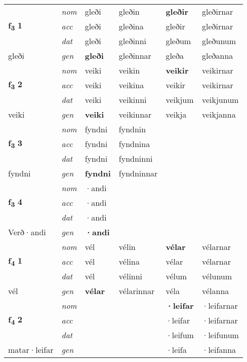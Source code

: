 \begin{longtable}[l]{X>{\footnotesize\itshape}XXXXX}
\multirow{3}{*}{{{\textbf{f{\textsubscript{3}}} \Large{\textbf{1}}}}} & nom & gleði & gleðin & \textbf{gleðir} & gleðirnar \\*
 & acc & gleði & gleðina & gleðir & gleðirnar \\*
 & dat & gleði & gleðinni & gleðum & gleðunum \\*
 {\footnotesize{gleði}} & gen & \textbf{gleði} & gleðinnar & gleða & gleðanna \\
\midrule

\multirow{3}{*}{{{\textbf{f{\textsubscript{3}}} \Large{\textbf{2}}}}} & nom & veiki & veikin & \textbf{veikir} & veikirnar \\*
 & acc & veiki & veikina & veikir & veikirnar \\*
 & dat & veiki & veikinni & veikjum & veikjunum \\*
 {\footnotesize{veiki}} & gen & \textbf{veiki} & veikinnar & veikja & veikjanna \\
\midrule

\multirow{3}{*}{{{\textbf{f{\textsubscript{3}}} \Large{\textbf{3}}}}} & nom & fyndni & fyndnin & \textbf{} &  \\*
 & acc & fyndni & fyndnina &  &  \\*
 & dat & fyndni & fyndninni &  &  \\*
 {\footnotesize{fyndni}} & gen & \textbf{fyndni} & fyndninnar &  &  \\
\midrule

\multirow{3}{*}{{{\textbf{f{\textsubscript{3}}} \Large{\textbf{4}}}}} & nom & ·andi &  & \textbf{} &  \\*
 & acc & ·andi &  &  &  \\*
 & dat & ·andi &  &  &  \\*
 {\footnotesize{Verð\allowbreak ·andi}} & gen & \textbf{·andi} &  &  &  \\
\midrule

\multirow{3}{*}{{{\textbf{f{\textsubscript{4}}} \Large{\textbf{1}}}}} & nom & vél & vélin & \textbf{vélar} & vélarnar \\*
 & acc & vél & vélina & vélar & vélarnar \\*
 & dat & vél & vélinni & vélum & vélunum \\*
 {\footnotesize{vél}} & gen & \textbf{vélar} & vélarinnar & véla & vélanna \\
\midrule

\multirow{3}{*}{{{\textbf{f{\textsubscript{4}}} \Large{\textbf{2}}}}} & nom &  &  & \textbf{·leifar} & ·leifarnar \\*
 & acc &  &  & ·leifar & ·leifarnar \\*
 & dat &  &  & ·leifum & ·leifunum \\*
 {\footnotesize{matar\allowbreak ·leifar}} & gen & \textbf{} &  & ·leifa & ·leifanna \\
\midrule


\end{longtable}
